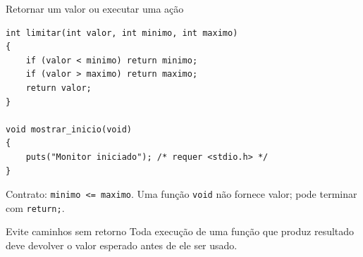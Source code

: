 \begin{frame}[fragile]{Retornar um valor ou executar uma ação}
\begin{lstlisting}
int limitar(int valor, int minimo, int maximo)
{
    if (valor < minimo) return minimo;
    if (valor > maximo) return maximo;
    return valor;
}

void mostrar_inicio(void)
{
    puts("Monitor iniciado"); /* requer <stdio.h> */
}
\end{lstlisting}
\small Contrato: \texttt{minimo <= maximo}. Uma função \texttt{void} não fornece valor; pode terminar com \texttt{return;}.
\begin{alertblock}{Evite caminhos sem retorno}
Toda execução de uma função que produz resultado deve devolver o valor esperado antes de ele ser usado.
\end{alertblock}
\end{frame}
